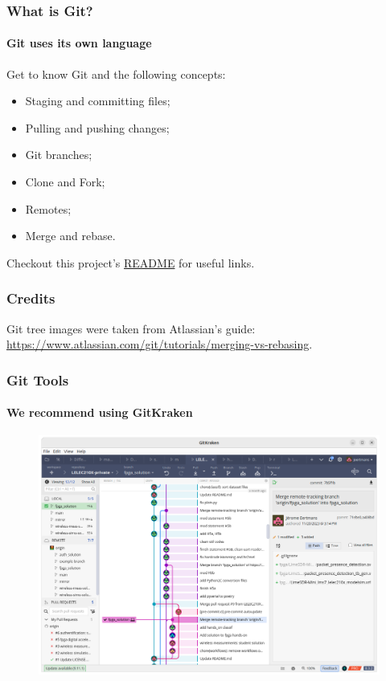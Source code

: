 \documentclass[t, aspectratio=169, english, table]{_style/tudelft-beamer}
\begin{document}
\begin{frame}
  \frametitle{What is Git?}
  \framesubtitle{Git uses its own language}

  Get to know Git and the following concepts:

  \begin{itemize}
      \item Staging and committing files;
      \item Pulling and pushing changes;
      \item Git branches;
      \item Clone and Fork;
      \item Remotes;
      \item Merge and rebase.
  \end{itemize}

  Checkout this project's \href{https://github.com/LELEC210X/LELEC210X}{\color{tud primary}README} for useful links.

\end{frame}

\begin{frame}
  \frametitle{Credits}

  Git tree images were taken from Atlassian's guide: \url{https://www.atlassian.com/git/tutorials/merging-vs-rebasing}.
\end{frame}

\begin{frame}
  \frametitle{Git Tools}
  \framesubtitle{We recommend using GitKraken}

  \begin{figure}
    \centering
    \includegraphics[height=.6\paperheight]{figures/gitkraken.png}
  \end{figure}

\end{frame}
\end{document}
